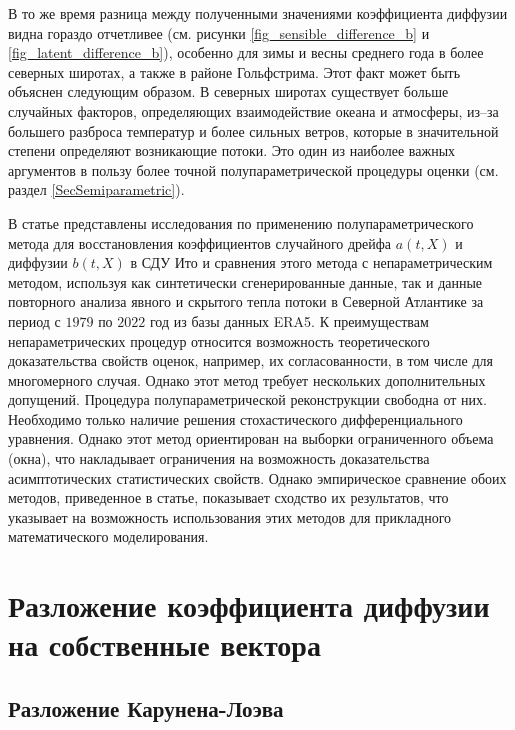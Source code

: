 В то же время разница между полученными значениями коэффициента диффузии видна гораздо отчетливее (см. рисунки \ref{fig_sensible_difference_b} и \ref{fig_latent_difference_b}), особенно для зимы и весны среднего года в более северных широтах, а также в районе Гольфстрима. Этот факт может быть объяснен следующим образом. В северных широтах существует больше случайных факторов, определяющих взаимодействие океана и атмосферы, из–за большего разброса температур и более сильных ветров, которые в значительной степени определяют возникающие потоки. Это один из наиболее важных аргументов в пользу более точной полупараметрической процедуры оценки (см. раздел \ref{SecSemiparametric}).

В статье представлены исследования по применению полупараметрического метода для восстановления коэффициентов случайного дрейфа $a(t,X)$ и диффузии $b(t,X)$ в СДУ Ито и сравнения этого метода с непараметрическим методом, используя как синтетически сгенерированные данные, так и данные повторного анализа явного и скрытого тепла потоки в Северной Атлантике за период с $1979$ по $2022$ год из базы данных ERA5.
К преимуществам непараметрических процедур относится возможность теоретического доказательства свойств оценок, например, их согласованности, в том числе для многомерного случая. Однако этот метод требует нескольких дополнительных допущений. Процедура полупараметрической реконструкции свободна от них. Необходимо только наличие решения стохастического дифференциального уравнения. Однако этот метод ориентирован на выборки ограниченного объема (окна), что накладывает ограничения на возможность доказательства асимптотических статистических свойств. Однако эмпирическое сравнение обоих методов, приведенное в статье, показывает сходство их результатов, что указывает на возможность использования этих методов для прикладного математического моделирования.

\section{Разложение коэффициента диффузии на собственные вектора}
\subsection{Разложение Карунена-Лоэва}   
\label{SecKarhunen}

